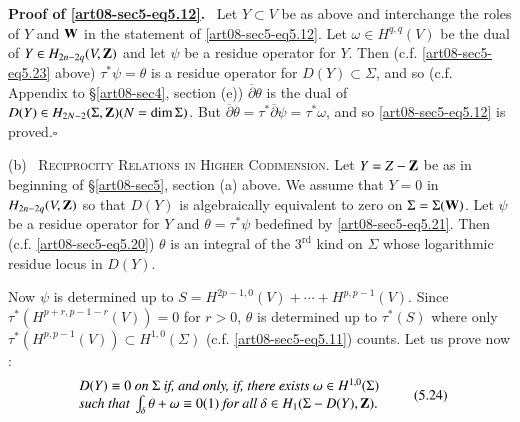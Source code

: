 \noindent
{\bf Proof of \eqref{art08-sec5-eq5.12}.}~ Let $Y\subset V$ be as above and interchange the roles of $Y$ and $\mathbf{W}$ in the statement of \eqref{art08-sec5-eq5.12}. Let $\omega\in H^{q,q}(V)$ be the dual of $Y\in H_{2n-2q}(V,\mathbf{Z})$ and let $\psi$ be a residue operator for $Y$. Then (c.f. \eqref{art08-sec5-eq5.23} above) $\tau^{*}\psi=\theta$ is a residue operator for $D(Y)\subset \Sigma$, and so (c.f. Appendix to \S\ref{art08-sec4}, section (e)) $\overline{\partial}\theta$ is the dual of $D(Y)\in H_{2N-2}(\Sigma,\mathbf{Z})(N=\dim \Sigma)$. But $\overline{\partial}\theta=\tau^{*}\overline{\partial}\psi=\tau^{*}\omega$, and so \eqref{art08-sec5-eq5.12} is proved.\hfill$\square$

\medskip
(b)~ \textsc{Reciprocity Relations in Higher Codimension.} Let $Y=Z-\mathbf{Z}$ be as in beginning of \S\ref{art08-sec5}, section (a) above. We assume that $Y=0$ in $H_{2n-2q}(V,\mathbf{Z})$ so that $D(Y)$ is algebraically equivalent to zero on $\Sigma=\Sigma(\mathbf{W})$. Let $\psi$ be a residue operator for $Y$ and $\theta=\tau^{*}\psi$ be\pageoriginale defined by \eqref{art08-sec5-eq5.21}. Then (c.f. \eqref{art08-sec5-eq5.20}) $\theta$ is an integral of the $3^{\text{rd}}$ kind on $\Sigma$ whose logarithmic residue locus in $D(Y)$.

Now $\psi$ is determined up to $S=H^{2p-1,0}(V)+\cdots+H^{p,p-1}(V)$. Since $\tau^{*}(H^{p+r,p-1-r}(V))=0$ for $r>0$, $\theta$ is determined up to $\tau^{*}(S)$ where only $\tau^{*}(H^{p,p-1}(V))\subset H^{1,0}(\Sigma)$ (c.f. \eqref{art08-sec5-eq5.11}) counts. Let us prove now :
\begin{equation*}
\begin{array}{l}
D(Y)\equiv 0\text{~\em on~} \Sigma \text{~\em if, and only, if, there exists~}\omega\in H^{1,0}(\Sigma)\\
\text{\em such that~}\int_{\delta}\theta+\omega\equiv 0(1)\text{~\em for all~}\delta\in H_{1}(\Sigma-D(Y),\mathbf{Z}).
\end{array}\tag{5.24}\label{art08-sec5-eq5.24}
\end{equation*}

